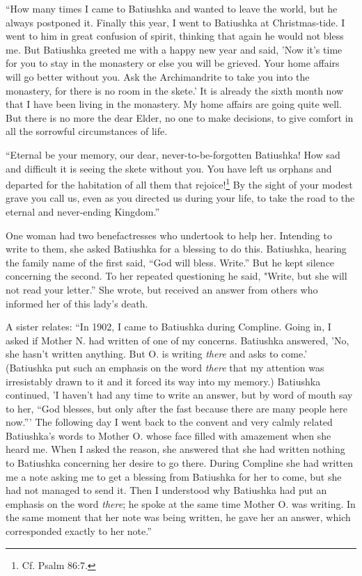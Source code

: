 “How many times I came to Batiushka and wanted to leave the world, but he always postponed it. Finally this year, I went to Batiushka at Christmas-tide. I went to him in great confusion of spirit, thinking that again he would not bless me. But Batiushka greeted me with a happy new year and said, 'Now it's time for you to stay in the monastery or else you will be grieved. Your home affairs will go better without you. Ask the Archimandrite to take you into the monastery, for there is no room in the skete.' It is already the sixth month now that I have been living in the monastery. My home affairs are going quite well. But there is no more the dear Elder, no one to make decisions, to give comfort in all the sorrowful circumstances of life.

“Eternal be your memory, our dear, never-to-be-forgotten Batiushka! How sad and difficult it is seeing the skete without you. You have left us orphans and departed for the habitation of all them that rejoice!\footnote{Cf. Psalm 86:7.} By the sight of your modest grave you call us, even as you directed us during your life, to take the road to the eternal and never-ending Kingdom.”

One woman had two benefactresses who undertook to help her. Intending to write to them, she asked Batiushka for a blessing to do this. Batiushka, hearing the family name of the first said, “God will bless. Write.” But he kept silence concerning the second. To her repeated questioning he said, "Write, but she will not read your letter.” She wrote, but received an answer from others who informed her of this lady's death.

A sister relates: “In 1902, I came to Batiushka during Compline. Going in, I asked if Mother N. had written of one of my concerns. Batiushka answered, 'No, she hasn't written anything. But O. is writing \textit{there} and asks to come.' (Batiushka put such an emphasis on the word \textit{there} that my attention was irresistably drawn to it and it forced its way into my memory.) Batiushka continued, 'I haven't had any time to write an answer, but by word of mouth say to her, “God blesses, but only after the fast because there are many people here now.”' The following day I went back to the convent and very calmly related Batiushka's words to Mother O. whose face filled with amazement when she heard me. When I asked the reason, she answered that she had written nothing to Batiushka concerning her desire to go there. During Compline she had written me a note asking me to get a blessing from Batiushka for her to come, but she had not managed to send it. Then I understood why Batiushka had put an emphasis on the word \textit{there}; he spoke at the same time Mother O. was writing. In the same moment that her note was being written, he gave her an answer, which corresponded exactly to her note.”

